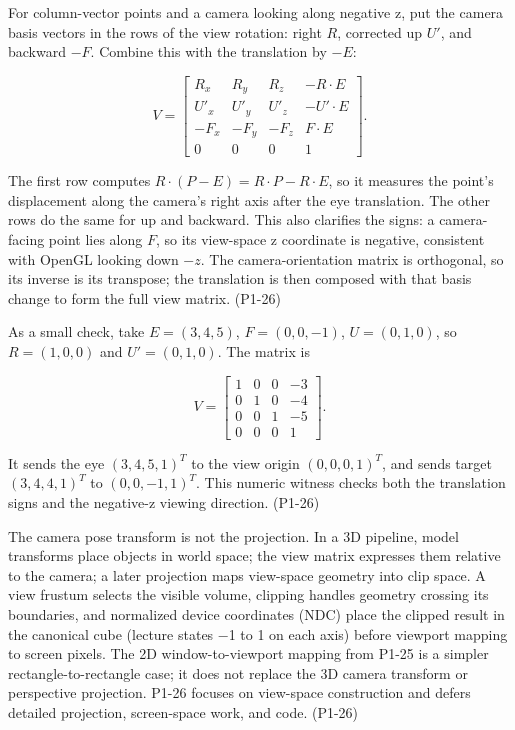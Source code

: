 For column-vector points and a camera looking along negative z, put the camera basis vectors in the rows of the view rotation: right \(R\), corrected up \(U'\), and backward \(-F\). Combine this with the translation by \(-E\):

\[
V=\begin{bmatrix}
R_x&R_y&R_z&-R\cdot E\\
U'_x&U'_y&U'_z&-U'\cdot E\\
-F_x&-F_y&-F_z&F\cdot E\\
0&0&0&1
\end{bmatrix}.
\]

The first row computes \(R\cdot(P-E)=R\cdot P-R\cdot E\), so it measures the point's displacement along the camera's right axis after the eye translation. The other rows do the same for up and backward. This also clarifies the signs: a camera-facing point lies along \(F\), so its view-space z coordinate is negative, consistent with OpenGL looking down \(-z\). The camera-orientation matrix is orthogonal, so its inverse is its transpose; the translation is then composed with that basis change to form the full view matrix. (P1-26)

As a small check, take \(E=(3,4,5)\), \(F=(0,0,-1)\), \(U=(0,1,0)\), so \(R=(1,0,0)\) and \(U'=(0,1,0)\). The matrix is

\[
V=\begin{bmatrix}1&0&0&-3\\0&1&0&-4\\0&0&1&-5\\0&0&0&1\end{bmatrix}.
\]

It sends the eye \((3,4,5,1)^T\) to the view origin \((0,0,0,1)^T\), and sends target \((3,4,4,1)^T\) to \((0,0,-1,1)^T\). This numeric witness checks both the translation signs and the negative-z viewing direction. (P1-26)

The camera pose transform is not the projection. In a 3D pipeline, model transforms place objects in world space; the view matrix expresses them relative to the camera; a later projection maps view-space geometry into clip space. A view frustum selects the visible volume, clipping handles geometry crossing its boundaries, and normalized device coordinates (NDC) place the clipped result in the canonical cube (lecture states −1 to 1 on each axis) before viewport mapping to screen pixels. The 2D window-to-viewport mapping from P1-25 is a simpler rectangle-to-rectangle case; it does not replace the 3D camera transform or perspective projection. P1-26 focuses on view-space construction and defers detailed projection, screen-space work, and code. (P1-26)

